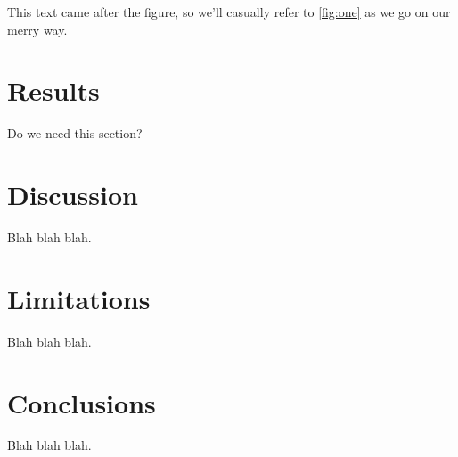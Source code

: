 \documentclass[letterpaper,twocolumn,10pt]{article}
\begin{document}
This text came after the figure, so we'll casually refer to \autoref{fig:one}
as we go on our merry way.

\section{Results}

Do we need this section?

\section{Discussion}

Blah blah blah.

\section{Limitations}

Blah blah blah.

\section{Conclusions}

Blah blah blah.

{\footnotesize 
}
\end{document}
